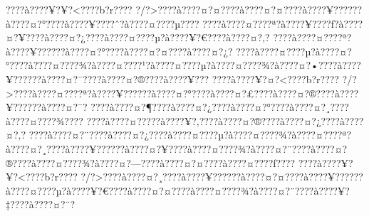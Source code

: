\documentclass[11pt, openany]{book}
\begin{document}
{{{{{{{{{{{{{{{{{{{{{{{{{{{{{{{{{{{{{{{{{{{{{{{{{{{{{{{{{{{{{{{{{{{{{{{{{{{{{{{{{{{{{{{{{{{{{{{{{{{{{{{{{{{{{???\textbar{}?à???\textbar{}?¥?¥?\textless{}???\textbar{}?b?r???\textbar{}?
?/?\textgreater{}???\textbar{}?à???\textbar{}?¤?¤???\textbar{}?à???\textbar{}?¤?¤???\textbar{}?à???\textbar{}?¥?????\textbar{}?à???\textbar{}?¤?°???\textbar{}?à???\textbar{}?¥???\textbar{}?ˆ?à???\textbar{}?¤???\textbar{}?µ???\textbar{}?
???\textbar{}?à???\textbar{}?¤???\textbar{}?ª?à???\textbar{}?¥???\textbar{}?ƒ?à???\textbar{}?¤?¥???\textbar{}?à???\textbar{}?¤?¿???\textbar{}?à???\textbar{}?¤???\textbar{}?µ?à???\textbar{}?¥?€???\textbar{}?à???\textbar{}?¤?‚?
???\textbar{}?à???\textbar{}?¤???\textbar{}?ª?à???\textbar{}?¥?????\textbar{}?à???\textbar{}?¤?°???\textbar{}?à???\textbar{}?¤?¤???\textbar{}?à???\textbar{}?¤?¿?
???\textbar{}?à???\textbar{}?¤???\textbar{}?µ?à???\textbar{}?¤?°???\textbar{}?à???\textbar{}?¤???\textbar{}?¾?à???\textbar{}?¤???\textbar{}?¹?à???\textbar{}?¤???\textbar{}?µ?à???\textbar{}?¤???\textbar{}?¾?à???\textbar{}?¤?•???\textbar{}?à???\textbar{}?¥?????\textbar{}?à???\textbar{}?¤?¯???\textbar{}?à???\textbar{}?¤?®???\textbar{}?à???\textbar{}?¥???
???\textbar{}?à???\textbar{}?¥?¤?\textless{}???\textbar{}?b?r???\textbar{}?
?/?\textgreater{}???\textbar{}?à???\textbar{}?¤???\textbar{}?ª?à???\textbar{}?¥?????\textbar{}?à???\textbar{}?¤?°???\textbar{}?à???\textbar{}?¤?£???\textbar{}?à???\textbar{}?¤?®???\textbar{}?à???\textbar{}?¥?????\textbar{}?à???\textbar{}?¤?¯?
???\textbar{}?à???\textbar{}?¤?¶???\textbar{}?à???\textbar{}?¤?¿???\textbar{}?à???\textbar{}?¤?°???\textbar{}?à???\textbar{}?¤?¸???\textbar{}?à???\textbar{}?¤???\textbar{}?¾???\textbar{}?
???\textbar{}?à???\textbar{}?¤?­???\textbar{}?à???\textbar{}?¥?‚???\textbar{}?à???\textbar{}?¤?®???\textbar{}?à???\textbar{}?¤?¿???\textbar{}?à???\textbar{}?¤?‚?
???\textbar{}?à???\textbar{}?¤?¨???\textbar{}?à???\textbar{}?¤?¿???\textbar{}?à???\textbar{}?¤???\textbar{}?µ?à???\textbar{}?¤???\textbar{}?¾?à???\textbar{}?¤???\textbar{}?ª?à???\textbar{}?¤?¸???\textbar{}?à???\textbar{}?¥?????\textbar{}?à???\textbar{}?¤?¥???\textbar{}?à???\textbar{}?¤???\textbar{}?¾?à???\textbar{}?¤?¨???\textbar{}?à???\textbar{}?¤?®???\textbar{}?à???\textbar{}?¤???\textbar{}?¾?à???\textbar{}?¤?---???\textbar{}?à???\textbar{}?¤?¤???\textbar{}?à???\textbar{}?¤???\textbar{}?ƒ???\textbar{}?
???\textbar{}?à???\textbar{}?¥?¥?\textless{}???\textbar{}?b?r???\textbar{}?
?/?\textgreater{}???\textbar{}?à???\textbar{}?¤?¸???\textbar{}?à???\textbar{}?¥?????\textbar{}?à???\textbar{}?¤?¤???\textbar{}?à???\textbar{}?¥?????\textbar{}?à???\textbar{}?¤???\textbar{}?µ?à???\textbar{}?¥?€???\textbar{}?à???\textbar{}?¤?¤???\textbar{}?à???\textbar{}?¤???\textbar{}?¾?à???\textbar{}?¤?¨???\textbar{}?à???\textbar{}?¥?‡???\textbar{}?à???\textbar{}?¤?¨?
}}}}}}}}}}}}}}}}}}}}}}}}}}}}}}}}}}}}}}}}}}}}}}}}}}}}}}}}}}}}}}}}}}}}}}}}}}}}}}}}}}}}}}}}}}}}}}}}}}}}}}}}}}}}}
\end{document}
